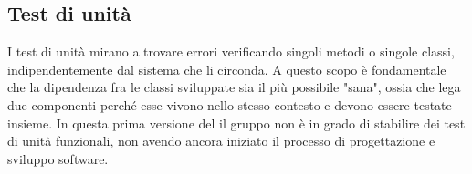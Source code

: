 \subsection{Test di unità}
I test di unità mirano a trovare errori verificando singoli metodi o singole classi, indipendentemente dal sistema che li circonda. A questo scopo è fondamentale che la dipendenza fra le classi sviluppate sia il più possibile "sana", ossia che lega due componenti perché esse vivono nello stesso contesto e devono essere testate insieme. 
In questa prima versione del \PdQ{} il gruppo non è in grado di stabilire dei test di unità funzionali, non avendo ancora iniziato il processo di progettazione e sviluppo software.